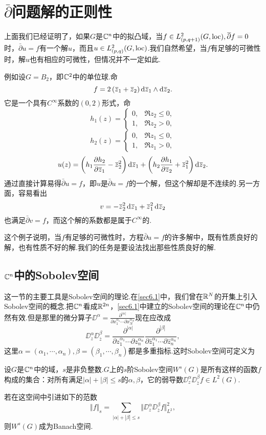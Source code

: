 \section{$\bar{\partial}$问题解的正则性\label{sec6.4}}
上面我们已经证明了，如果$G$是$\mathbb C^n$中的拟凸域，当$f\in L_{(p,q+1)}^2(G,\operatorname{loc}),{}\mkern1mu\overline{\mkern-1mu\partial}f=0$时，$\bar{\partial}u=f$有一个解$u$，而且$u\in L_{(p,q)}^2(G,\operatorname{loc})$.我们自然希望，当$f$有足够的可微性时，解$u$也有相应的可微性，但情况并不一定如此.

例如设$G=B_2$，即$\mathbb C^2$中的单位球.命
\[f=2\left({}\mkern1mu\overline{\mkern-1muz}_1+{}\mkern1mu\overline{\mkern-1muz}_2\right)\mathop{}\!\mathrm d{}\mkern1mu\overline{\mkern-1muz}_1\wedge\mathop{}\!\mathrm d{}\mkern1mu\overline{\mkern-1muz}_2.\]
它是一个具有$C^\infty$系数的$(0,2)$形式，命
\[h_1(z)=\begin{cases}
	0,&\Re z_2\le0,\\
	1,&\Re z_2>0,
\end{cases}\]
\[h_2(z)=\begin{cases}
	0,&\Re z_1\le0,\\
	1,&\Re z_1>0,
\end{cases}\]
\[u(z)=\left(h_1\frac{\partial h_2}{\partial {}\mkern1mu\overline{\mkern-1muz}_1}-{}\mkern1mu\overline{\mkern-1muz}_2^2\right)\mathop{}\!\mathrm d{}\mkern1mu\overline{\mkern-1muz}_1+\left(h_2\frac{\partial h_1}{\partial {}\mkern1mu\overline{\mkern-1muz}_2}+{}\mkern1mu\overline{\mkern-1muz}_1^2\right)\mathop{}\!\mathrm d{}\mkern1mu\overline{\mkern-1muz}_2.\]
通过直接计算易得$\bar{\partial}u=f$，即$u$是$\bar{\partial}u=f$的一个解，但这个解却是不连续的.另一方面，容易看出
\[v=-{}\mkern1mu\overline{\mkern-1muz}_2^2\mathop{}\!\mathrm d{}\mkern1mu\overline{\mkern-1muz}_1+{}\mkern1mu\overline{\mkern-1muz}_1^2\mathop{}\!\mathrm d{}\mkern1mu\overline{\mkern-1muz}_2\]
也满足$\bar{\partial}v=f$，而这个解的系数都是属于$C^\infty$的.

这个例子说明，当$f$有足够的可微性时，方程$\bar{\partial}u=f$的许多解中，既有性质良好的解，也有性质不好的解.我们的任务是要设法找出那些性质良好的解.
\subsection{$\mathbb C^n$中的Sobolev空间}
这一节的主要工具是Sobolev空间的理论.在\ref{sec6.1}中，我们曾在$\mathbb R^N$的开集上引入Sobolev空间的概念.把$\mathbb C^n$看成$\mathbb R^{2n}$，\ref{sec6.1}中建立的Sobolev空间的理论在$\mathbb C^n$中仍然有效.但是那里的微分算子$\DD^\alpha=\frac{\partial^{|\alpha|}}{\partial x_1^{\alpha_1}\cdots\partial x_N^{\alpha_N}}$现在应改成
\[\DD_z^\alpha \DD_{\bar{z}}^\beta=\frac{\partial^{|\alpha|}}{\partial z_1^{\alpha_1}\cdots\partial z_n^{\alpha_n}}\frac{\partial^{|\beta|}}{\partial \bar{z}_1^{\alpha_1}\cdots\partial \bar{z}_n^{\alpha_n}},\]
这里$\alpha=(\alpha_1,\cdots,\alpha_n),\beta=(\beta_1,\cdots,\beta_n)$都是多重指标.这时Sobolev空间可定义为
\begin{definition}\label{def6.4.1}
	设$G$是$\mathbb C^n$中的域，$s$是非负整数.$G$上的$s$阶Sobolev空间$W^s(G)$是所有这样的函数$f$构成的集合：对所有满足$|\alpha|+|\beta|\le s$的$\alpha,\beta$，它的弱导数$\DD_z^\alpha \DD_{\bar{z}}^\beta f\in L^2(G)$.
\end{definition}
若在这空间中引进如下的范数
\[\Vert f\Vert_s=\sum_{|\alpha|+|\beta|\le s}\Vert\DD_z^\alpha\DD_{\bar{z}}^\beta f\Vert_{L^2}^2,\]
则$W^s(G)$成为Banach空间.

